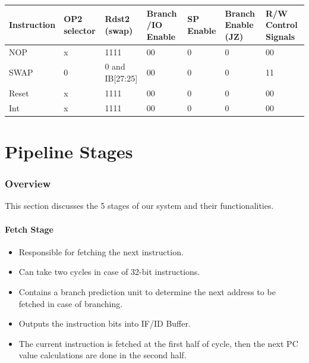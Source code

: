 \documentclass[12pt]{report}
\begin{document}
\begin{center}
\begin{tabular}{||p{20mm}| p{15mm}| p{15mm}| p{15mm}| p{15mm}| p{15mm}| p{15mm}||} 
\hline
Instruction & OP2 selector & Rdst2 (swap) & Branch /IO Enable & SP Enable & Branch Enable (JZ) & R/W Control Signals  \\ [0.5ex] 
\hline\hline
NOP & x & 1111 & 00 & 0 & 0 & 00 \\
\hline
SWAP & 0 & 0 and IB[27:25] & 00 & 0 & 0 & 11 \\
\hline
Reset & x & 1111 & 00 & 0 & 0 & 00 \\
\hline
Int & x & 1111 & 00 & 0 & 0 & 00 \\
\hline
\end{tabular}
\end{center}

\part{Pipeline Stages}

\section{Overview}
This section discusses the 5 stages of our system and their functionalities.

\subsection{Fetch Stage}
\begin{itemize}
    \item Responsible for fetching the next instruction.
    \item Can take two cycles in case of 32-bit instructions.
    \item Contains a branch prediction unit to determine the next address to be fetched in case of branching.
    \item Outputs the instruction bits into IF/ID Buffer.
    \item The current instruction is fetched at the first half of cycle, then the next PC value calculations are done in the second half.
\end{itemize}
\end{document}
